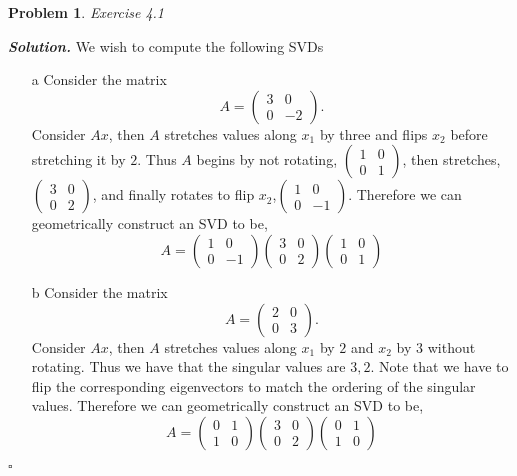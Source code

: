 \documentclass[12pt]{report}
\newtheorem{problem}{Problem}
\newenvironment{solution}[1][\it{Solution}]{\textbf{#1. } }{$\square$}
\begin{document}



\begin{problem}
    Exercise 4.1
\end{problem}

\begin{solution}
    \noindent
    We wish to compute the following SVDs
    \begin{enumerate}
        \item [a] Consider the matrix $$A = \begin{pmatrix} 3&0\\0&-2\end{pmatrix}.$$ Consider $Ax$, then $A$ stretches values along $x_1$ by three and flips $x_2$ before stretching it by $2$. Thus $A$ begins by not rotating, $\begin{pmatrix} 1&0\\0&1\end{pmatrix}$, then stretches, $\begin{pmatrix} 3&0\\0&2\end{pmatrix}$, and finally rotates to flip $x_2$,$\begin{pmatrix} 1&0\\0&-1\end{pmatrix}$. Therefore we can geometrically construct an SVD to be, $$A = \begin{pmatrix} 1&0\\0&-1\end{pmatrix}\begin{pmatrix} 3&0\\0&2\end{pmatrix}\begin{pmatrix} 1&0\\0&1\end{pmatrix}$$
        
        \item [b] Consider the matrix $$A = \begin{pmatrix} 2&0\\0&3 \end{pmatrix}.$$ Consider $Ax$, then $A$ stretches values along $x_1$ by $2$ and $x_2$ by $3$ without rotating. Thus we have that the singular values are $3,2$. Note that we have to flip the corresponding eigenvectors to match the ordering of the singular values. Therefore we can geometrically construct an SVD to be, $$A = \begin{pmatrix} 0&1\\1&0\end{pmatrix}\begin{pmatrix} 3&0\\0&2\end{pmatrix}\begin{pmatrix} 0&1\\1&0\end{pmatrix}$$
        

\end{enumerate}
\end{solution}
\end{document}
